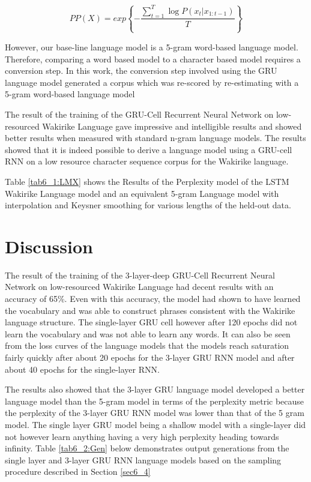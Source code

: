 \begin{equation}
    PP(X)=exp\left\{−\frac{\sum_{t=1}^T\log P(x_t|x_{1:t−1})}{T}\right\}
\label{ch5_eq3_ppx}
\end{equation}

However, our base-line language model is a 5-gram word-based language model.  Therefore, comparing a word based model to a character based model requires a conversion step. In this work, the conversion step involved using the GRU language model generated a corpus which was re-scored by re-estimating with a 5-gram word-based language model

The result of the training of the GRU-Cell Recurrent Neural Network on low-resourced Wakirike Language gave impressive and intelligible results and showed better results when measured with standard n-gram language models. The results showed that it is indeed possible to derive a language model using a GRU-cell RNN on a low resource character sequence corpus for the Wakirike language.


Table \ref{tab6_1:LMX} shows the Results of the Perplexity model of the LSTM Wakirike Language model and an equivalent 5-gram Language model with interpolation and Keysner smoothing \citep{chen1996empirical} for various lengths of the held-out data.

\section{Discussion}
The result of the training of the 3-layer-deep GRU-Cell Recurrent Neural Network on low-resourced Wakirike Language had decent results with an accuracy of 65\%.  Even with this accuracy, the model had shown to have learned the vocabulary and was able to construct phrases consistent with the Wakirike language structure.  The single-layer GRU cell however after 120 epochs did not learn the vocabulary and was not able to learn any words.  It can also be seen from the loss curves of the language models that the models reach saturation fairly quickly after about 20 epochs for the 3-layer GRU RNN model and after about 40 epochs for the single-layer RNN.


The results also showed that the 3-layer GRU language model developed a better language model than the 5-gram model in terms of the perplexity metric because the perplexity of the 3-layer GRU RNN model was lower than that of the 5 gram model.  The single layer GRU model being a shallow model with a single-layer did not however learn anything having a  very high perplexity heading towards infinity.  Table \ref{tab6_2:Gen} below demonstrates output generations from the single layer and 3-layer GRU RNN language models based on the sampling procedure described in Section \ref{sec6_4}

